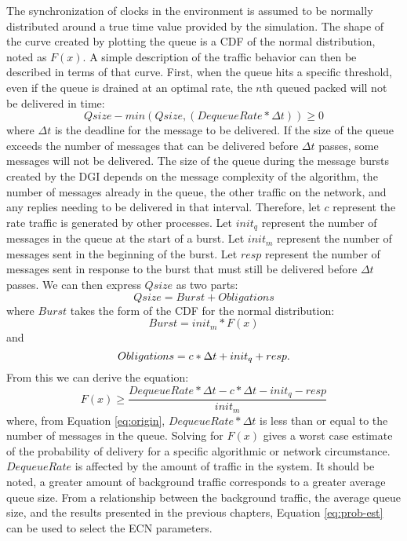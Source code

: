 The synchronization of clocks in the environment is assumed to be normally distributed around a true time value provided by the simulation.
The shape of the curve created by plotting the queue is a \ac{CDF} of the normal distribution, noted as $F(x)$.
A simple description of the traffic behavior can then be described in terms of that curve.
First, when the queue hits a specific threshold, even if the queue is drained at an optimal rate, the $n$th queued packed will not be delivered in time:
\begin{equation}
Qsize - min(Qsize, (DequeueRate * \Delta t)) \geq 0
\label{eq:origin}
\end{equation}%
where $\Delta t$ is the deadline for the message to be delivered.
If the size of the queue exceeds the number of messages that can be delivered before $\Delta t$ passes, some messages will not be delivered.
The size of the queue during the message bursts created by the DGI depends on the message complexity of the algorithm, the number of messages already in the queue, the other traffic on the network, and any replies needing to be delivered in that interval.
Therefore, let $c$ represent the rate traffic is generated by other processes.
Let $init_q$ represent the number of messages in the queue at the start of a burst. 
Let $init_m$ represent the number of messages sent in the beginning of the burst.
Let $resp$ represent the number of messages sent in response to the burst that must still be delivered before $\Delta t$ passes.
We can then express $Qsize$ as two parts:
\begin{equation}
Qsize = Burst + Obligations
\end{equation}%
where $Burst$ takes the form of the \ac{CDF} for the normal distribution:
\begin{equation}Burst = init_m * F(x)\end{equation}and
    \vspace{24pt}
\begin{equation}
Obligations = c * \Delta t + init_q + resp.
\vspace{12pt}
\end{equation}
From this we can derive the equation:
\vspace{12pt}
\begin{equation}
F(x) \geq \frac{DequeueRate * \Delta t - c * \Delta t - init_q - resp}{init_m}
\label{eq:prob-est}
\end{equation}%
where, from Equation \ref{eq:origin}, $DequeueRate * \Delta t$ is less than or equal to the number of messages in the queue. 
Solving for $F(x)$ gives a worst case estimate of the probability of delivery for a specific algorithmic or network circumstance.
$DequeueRate$ is affected by the amount of traffic in the system. 
It should be noted, a greater amount of background traffic corresponds to a greater average queue size.
From a relationship between the background traffic, the average queue size, and the results presented in the previous chapters, Equation \ref{eq:prob-est} can be used to select the ECN parameters.

